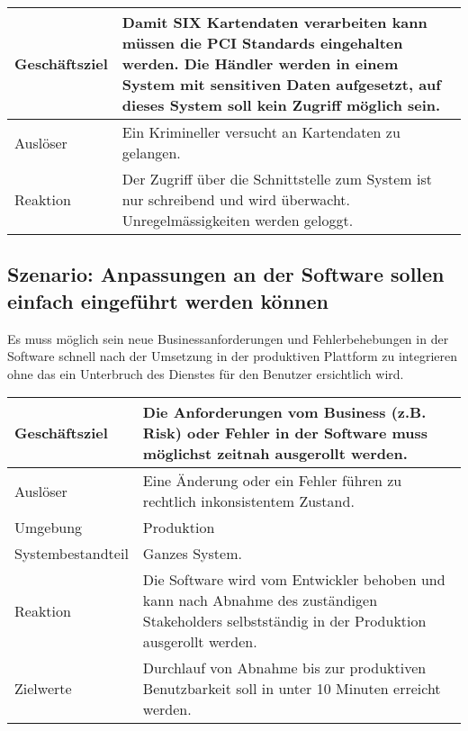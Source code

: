 \begin{table}[H]
	\centering
	\begin{tabular}{ | p{3cm} | p{11cm} | }
		\toprule
		Geschäftsziel & Damit SIX Kartendaten verarbeiten kann müssen die PCI Standards eingehalten werden. Die Händler werden in einem System mit sensitiven Daten aufgesetzt, auf dieses System soll kein Zugriff möglich sein. \\ \hline
		Auslöser & Ein Krimineller versucht an Kartendaten zu gelangen. \\ \hline
		Reaktion & Der Zugriff über die Schnittstelle zum System ist nur schreibend und wird überwacht. Unregelmässigkeiten werden geloggt. \\
		\bottomrule
	\end{tabular}
\end{table}

\subsection{Szenario: Anpassungen an der Software sollen einfach eingeführt werden können}

Es muss möglich sein neue Businessanforderungen und Fehlerbehebungen in der Software schnell nach der Umsetzung in der produktiven Plattform zu integrieren ohne das ein Unterbruch des Dienstes für den Benutzer ersichtlich wird.

\begin{table}[H]
	\centering
	\begin{tabular}{ | p{3cm} | p{11cm} | }
		\toprule
		Geschäftsziel & Die Anforderungen vom Business (z.B. Risk) oder Fehler in der Software muss möglichst zeitnah ausgerollt werden. \\ \hline
		Auslöser & Eine Änderung oder ein Fehler führen zu rechtlich inkonsistentem Zustand. \\ \hline
		Umgebung & Produktion\\ \hline
		Systembestandteil & Ganzes System. \\ \hline
		Reaktion & Die Software wird vom Entwickler behoben und kann nach Abnahme des zuständigen Stakeholders selbstständig in der Produktion ausgerollt werden. \\ \hline
		Zielwerte & Durchlauf von Abnahme bis zur produktiven Benutzbarkeit soll in unter 10 Minuten erreicht werden.\\
		\bottomrule
	\end{tabular}
\end{table}

